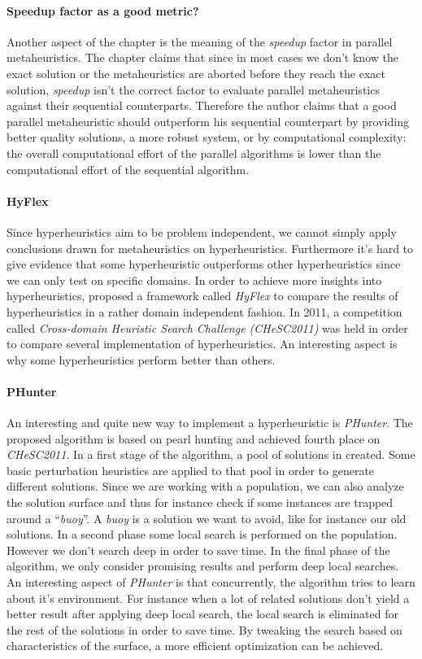 \documentclass{IEEEconf}
\begin{document}
\paragraph{Speedup factor as a good metric?}
Another aspect of the chapter is the meaning of the \emph{speedup} factor in parallel metaheuristics. The chapter claims that since in most cases we don't know the exact solution or the metaheuristics are aborted before they reach the exact solution, \emph{speedup} isn't the correct factor to evaluate parallel metaheuristics against their sequential counterparts. Therefore the author claims that a good parallel metaheuristic should outperform his sequential counterpart by providing better quality solutions, a more robust system, or by computational complexity: the overall computational effort of the parallel algorithms is lower than the computational effort of the sequential algorithm.
\paragraph{HyFlex}
Since hyperheuristics aim to be problem independent, we cannot simply apply conclusions drawn for metaheuristics on hyperheuristics. Furthermore it's hard to give evidence that some hyperheuristic outperforms other hyperheuristics since we can only test on specific domains. In order to achieve more insights into hyperheuristics, \cite{conf/cec/BurkeCHKOPRG10} proposed a framework called \emph{HyFlex} to compare the results of hyperheuristics in a rather domain independent fashion. In 2011, a competition called \emph{Cross-domain Heuristic Search Challenge (CHeSC2011)}\cite{Burke:2011:CHS:2177360.2177415} was held in order to compare several implementation of hyperheuristics. An interesting aspect is why some hyperheuristics perform better than others.
\paragraph{PHunter}
An interesting and quite new way to implement a hyperheuristic is \emph{PHunter}\cite{conf/lion/ChanXIC12}. The proposed algorithm is based on pearl hunting and achieved fourth place on \emph{CHeSC2011}. In a first stage of the algorithm, a pool of solutions in created. Some basic perturbation heuristics are applied to that pool in order to generate different solutions. Since we are working with a population, we can also analyze the solution surface and thus for instance check if some instances are trapped around a ``\emph{buoy}''. A \emph{buoy} is a solution we want to avoid, like for instance our old solutions. In a second phase some local search is performed on the population. However we don't search deep in order to save time. In the final phase of the algorithm, we only consider promising results and perform deep local searches. An interesting aspect of \emph{PHunter} is that concurrently, the algorithm tries to learn about it's environment. For instance when a lot of related solutions don't yield a better result after applying deep local search, the local search is 
eliminated for the rest of the solutions in order to save time. By tweaking the search based on characteristics of the surface, a more efficient optimization can be achieved.
\end{document}
